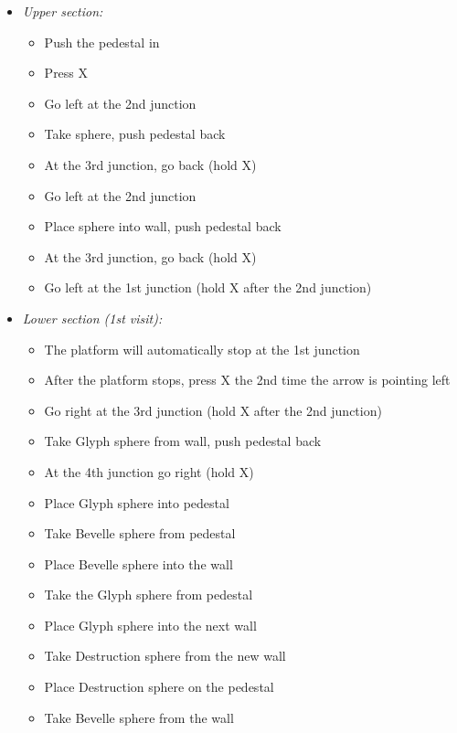 \begin{trial}
    \begin{itemize}
        \item \textit{Upper section:}
        \begin{itemize}
            \item Push the pedestal in
            \item Press X
            \item Go left at the 2nd junction
            \item Take sphere, push pedestal back
            \item At the 3rd junction, go back (hold X)
            \item Go left at the 2nd junction
            \item Place sphere into wall, push pedestal back
            \item At the 3rd junction, go back (hold X)
            \item Go left at the 1st junction (hold X after the 2nd junction)
        \end{itemize}
        \item \textit{Lower section (1st visit):}
        \begin{itemize}
            \item The platform will automatically stop at the 1st junction
            \item After the platform stops, press X the 2nd time the arrow is pointing left
            \item Go right at the 3rd junction (hold X after the 2nd junction)
            \item Take Glyph sphere from wall, push pedestal back
            \item At the 4th junction go right (hold X)
            \item Place Glyph sphere into pedestal
            \item Take Bevelle sphere from pedestal
            \item Place Bevelle sphere into the wall
            \item Take the Glyph sphere from pedestal
            \item Place Glyph sphere into the next wall
            \item Take Destruction sphere from the new wall
            \item Place Destruction sphere on the pedestal
            \item Take Bevelle sphere from the wall

\end{itemize}
\end{itemize}
\end{trial}
